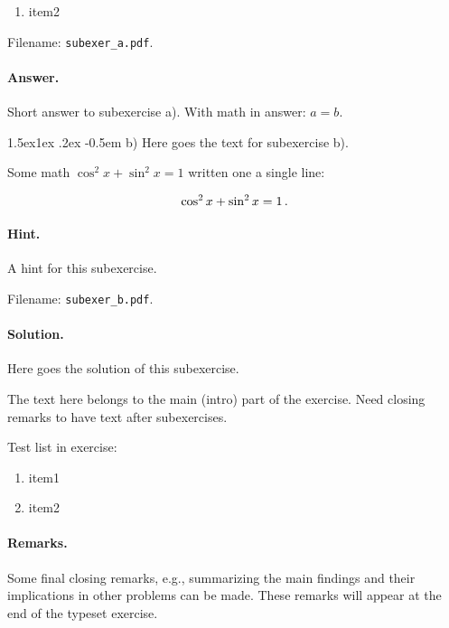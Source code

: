 \documentclass[%
oneside,                 %
final,                   %
10pt]{article}
\makeatletter
\newenvironment{doconceexercise}{}{}
\newcommand\subex{\@startsection{paragraph}{4}{\z@}%
                  {1.5ex\@plus1ex \@minus.2ex}%
                  {-0.5em}%
                  {\normalfont\normalsize\bfseries}}
\theoremstyle{definition}
\makeatother
\begin{document}
\begin{enumerate}
\begin{doconceexercise}
\begin{enumerate}
\item item2
\end{enumerate}

\noindent
\noindent Filename: \Verb!subexer_a.pdf!.

\paragraph{Answer.}
Short answer to subexercise a).
With math in answer: $a=b$.

\subex{b)}
Here goes the text for subexercise b).

Some math $\cos^2 x + \sin^2 x = 1$ written one a single line:

\[ \cos^2 x + \sin^2 x = 1 \thinspace .\]


\paragraph{Hint.}
A hint for this subexercise.

\noindent Filename: \Verb!subexer_b.pdf!.

\paragraph{Solution.}
Here goes the solution of this subexercise.

The text here belongs to the main (intro) part of the exercise. Need
closing remarks to have text after subexercises.

Test list in exercise:

\begin{enumerate}
\item item1

\item item2
\end{enumerate}

\noindent
\paragraph{Remarks.}
Some final closing remarks, e.g., summarizing the main findings
and their implications in other problems can be made. These
remarks will appear at the end of the typeset exercise.


\end{doconceexercise}
\end{enumerate}
\end{document}
